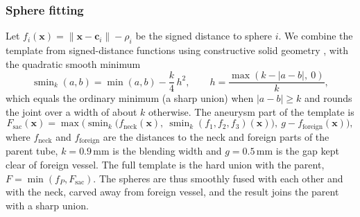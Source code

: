 \subsubsection*{Sphere fitting}

Let $f_i(\mathbf{x}) = \lVert \mathbf{x} - \mathbf{c}_i \rVert - \rho_i$ be the signed distance to sphere $i$. We combine the template from signed-distance functions using constructive solid geometry \citep{ricci1973,pasko1995}, with the quadratic smooth minimum
\begin{equation}
    \operatorname{smin}_k(a,b) = \min(a,b) - \frac{k}{4}\,h^2, \qquad h = \frac{\max\left(k - |a-b|,\ 0\right)}{k},
\end{equation}
which equals the ordinary minimum (a sharp union) when $|a-b| \ge k$ and rounds the joint over a width of about $k$ otherwise. The aneurysm part of the template is
\begin{equation}
    F_\text{sac}(\mathbf{x}) = \max\Big( \operatorname{smin}_k\big( f_\text{neck}(\mathbf{x}),\ \operatorname{smin}_k(f_1, f_2, f_3)(\mathbf{x}) \big),\ g - f_\text{foreign}(\mathbf{x}) \Big),
    \label{eq:dp_sac}
\end{equation}
where $f_\text{neck}$ and $f_\text{foreign}$ are the distances to the neck and foreign parts of the parent tube, $k = 0.9$\,mm is the blending width and $g = 0.5$\,mm is the gap kept clear of foreign vessel. The full template is the hard union with the parent, $F = \min(f_P, F_\text{sac})$. The spheres are thus smoothly fused with each other and with the neck, carved away from foreign vessel, and the result joins the parent with a sharp union.

